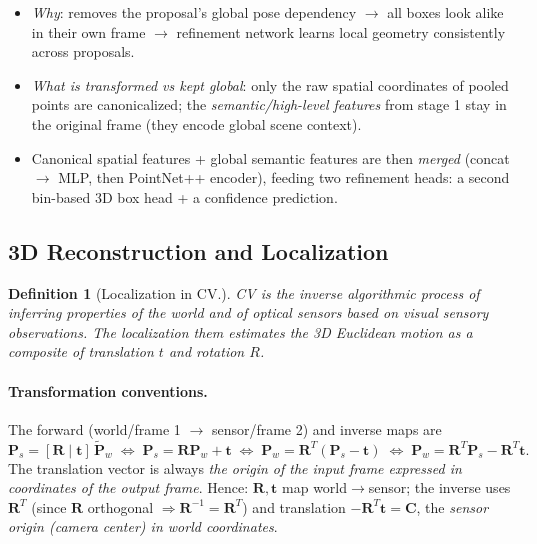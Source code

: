 \documentclass{article}
\newtheorem{definition}{Definition}
\begin{document}
\begin{itemize}
\begin{itemize}
        \item \textit{Why}: removes the proposal's global pose dependency $\rightarrow$ all boxes look alike in their own frame $\rightarrow$ refinement network learns local geometry consistently across proposals.
        \item \textit{What is transformed vs kept global}: only the raw spatial coordinates of pooled points are canonicalized; the \textit{semantic/high-level features} from stage 1 stay in the original frame (they encode global scene context).
        \item Canonical spatial features + global semantic features are then \textit{merged} (concat $\rightarrow$ MLP, then PointNet++ encoder), feeding two refinement heads: a second bin-based 3D box head + a confidence prediction.
    \end{itemize}
\end{itemize}


\subsection{3D Reconstruction and Localization}
\begin{definition}[Localization in CV.]
    CV is the inverse algorithmic process of inferring properties of the world and of optical sensors based on visual sensory observations. The localization them estimates the 3D Euclidean motion as a composite of translation $t$ and rotation $R$.
\end{definition}


\paragraph{Transformation conventions.} The forward (world/frame 1 $\to$ sensor/frame 2) and inverse maps are
\begin{equation*}
    \mathbf{P}_s = [\mathbf{R}\mid\mathbf{t}]\,\tilde{\mathbf{P}}_w \;\Leftrightarrow\; \mathbf{P}_s = \mathbf{R}\mathbf{P}_w + \mathbf{t} \;\Leftrightarrow\; \mathbf{P}_w = \mathbf{R}^T(\mathbf{P}_s - \mathbf{t}) \;\Leftrightarrow\; \mathbf{P}_w = \mathbf{R}^T\mathbf{P}_s - \mathbf{R}^T\mathbf{t}.
\end{equation*}
The translation vector is always \textit{the origin of the input frame expressed in coordinates of the output frame}. Hence: $\mathbf{R}, \mathbf{t}$ map world$\to$sensor; the inverse uses $\mathbf{R}^T$ (since $\mathbf{R}$ orthogonal $\Rightarrow \mathbf{R}^{-1}=\mathbf{R}^T$) and translation $-\mathbf{R}^T\mathbf{t} = \mathbf{C}$, the \textit{sensor origin (camera center) in world coordinates}.
\end{document}
